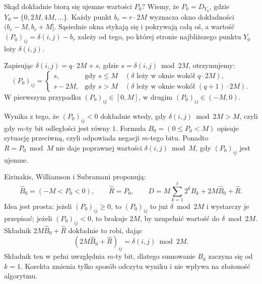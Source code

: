 Skąd dokładnie biorą się ujemne wartości $P_0$? Wiemy, że $P_0 = D_{Y_0}$, gdzie $Y_0 = \{0, 2M, 4M, \ldots\}$. Każdy punkt $b_r = r \cdot 2M$ wyznacza okno dokładności $(b_r - M, b_r + M]$. Sąsiednie okna stykają się i pokrywają całą oś, a wartość $(P_0)_{ij} = \delta(i,j) - b_r$ zależy od tego, po której stronie najbliższego punktu $Y_0$ leży $\delta(i,j)$.

Zapisując $\delta(i,j) = q \cdot 2M + s$, gdzie $s = \delta(i,j) \bmod 2M$, otrzymujemy:
\[
(P_0)_{ij} = \begin{cases}
s, & \text{gdy } s \leq M \quad (\delta \text{ leży w oknie wokół } q \cdot 2M),\\[2pt]
s - 2M, & \text{gdy } s > M \quad (\delta \text{ leży w oknie wokół } (q+1) \cdot 2M).
\end{cases}
\]
W pierwszym przypadku $(P_0)_{ij} \in [0, M]$, w drugim $(P_0)_{ij} \in (-M, 0)$.

Wynika z tego, że $(P_0)_{ij} < 0$ dokładnie wtedy, gdy $\delta(i,j) \bmod 2M > M$, czyli gdy $m$-ty bit odległości jest równy $1$. Formuła $B_0=(0\leq P_0<M)$ opisuje sytuację przeciwną, czyli odpowiada negacji $m$-tego bitu. Ponadto $R=P_0\bmod M$ nie daje poprawnej wartości $\delta(i,j)\bmod M$, gdy $(P_0)_{ij}$ jest ujemne.


Eirinakis, Williamson i Subramani proponują:
\[
\widehat{B}_0 = (-M < P_0 < 0), \qquad \widehat{R} = P_0, \qquad D = M \sum_{k=1}^{\ell} 2^k B_k + 2M \widehat{B}_0 + \widehat{R}.
\]
Idea jest prosta: jeżeli $(P_0)_{ij} \geq 0$, to $(P_0)_{ij}$ to już $\delta \bmod 2M$ i wystarczy je przepisać; jeżeli $(P_0)_{ij} < 0$, to brakuje $2M$, by uzupełnić wartość do $\delta \bmod 2M$. Składnik $2M \widehat{B}_0 + \widehat{R}$ dokładnie to robi, dając
\[
(2M \widehat{B}_0 + \widehat{R})_{ij} = \delta(i,j) \bmod 2M.
\]
Składnik ten w pełni uwzględnia $m$-ty bit, dlatego sumowanie $B_k$ zaczyna się od $k=1$. Korekta zmienia tylko sposób odczytu wyniku i nie wpływa na złożoność algorytmu.

\newpage